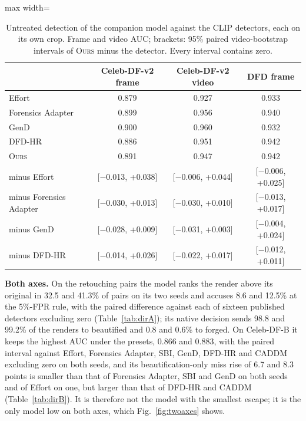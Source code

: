 \documentclass[conference]{IEEEtran}
\newcommand{\ours}{\textsc{Ours}}
\begin{document}
\begin{table}[t]
\centering
\caption{Untreated detection of the companion model against the CLIP detectors, each on its own crop. Frame and video AUC;
brackets: 95\% paired video-bootstrap intervals of \ours{} minus the detector. Every interval contains zero.}
\label{tab:companion}
\scriptsize
\setlength{\tabcolsep}{3pt}
\begin{adjustbox}{max width=\columnwidth}
\begin{tabular}{@{}l cc c@{}}
\toprule
 & Celeb-DF-v2 frame & Celeb-DF-v2 video & DFD frame \\
\midrule
Effort & 0.879 & 0.927 & 0.933 \\
Forensics Adapter & 0.899 & 0.956 & 0.940 \\
GenD & 0.900 & 0.960 & 0.932 \\
DFD-HR & 0.886 & 0.951 & 0.942 \\
\ours{} & 0.891 & 0.947 & 0.942 \\
\quad minus Effort & [$-$0.013, +0.038] & [$-$0.006, +0.044] & [$-$0.006, +0.025] \\
\quad minus Forensics Adapter & [$-$0.030, +0.013] & [$-$0.030, +0.010] & [$-$0.013, +0.017] \\
\quad minus GenD & [$-$0.028, +0.009] & [$-$0.031, +0.003] & [$-$0.004, +0.024] \\
\quad minus DFD-HR & [$-$0.014, +0.026] & [$-$0.022, +0.017] & [$-$0.012, +0.011] \\
\bottomrule
\end{tabular}
\end{adjustbox}
\end{table}

\textbf{Both axes.} On the retouching pairs the model ranks the render above its original in 32.5 and 41.3\% of pairs on
its two seeds and accuses 8.6 and 12.5\% at the 5\%-FPR rule, with the paired difference against each of sixteen published
detectors excluding zero (Table~\ref{tab:dirA}); its native decision sends 98.8 and 99.2\% of the renders to beautified and
0.8 and 0.6\% to forged.
On Celeb-DF-B it keeps the highest AUC under the presets, 0.866 and 0.883, with the paired interval against Effort,
Forensics Adapter, SBI, GenD, DFD-HR and CADDM excluding zero on both seeds, and its beautification-only miss rise of 6.7
and 8.3 points is smaller than that of Forensics Adapter, SBI and GenD on both seeds and of Effort on one, but larger than
that of DFD-HR and CADDM (Table~\ref{tab:dirB}).
It is therefore not the model with the smallest escape; it is the only model low on both axes, which Fig.~\ref{fig:twoaxes}
shows.
\end{document}
